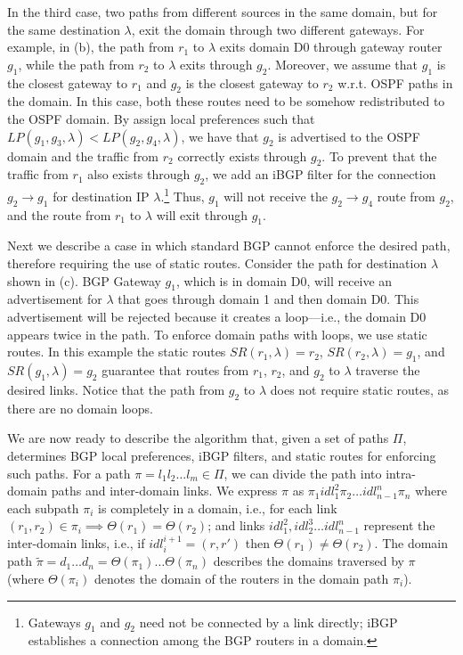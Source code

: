 In the third case, two paths from different sources in the same domain, but for the same destination $\lambda$, exit 
the domain through two different
gateways.
For example, in (b),
the path from $r_1$ to $\lambda$ exits domain D0 through 
gateway router $g_1$, while the path from $r_2$  to $\lambda$ exits 
through $g_2$. 
Moreover,  we assume that $g_1$ is the closest gateway to $r_1$ and 
$g_2$ is the closest gateway to $r_2$ w.r.t. OSPF paths in the domain.
In this case, both these routes need to be 
somehow redistributed to the OSPF domain. 
By assign local preferences such that
$LP(g_1,g_3,\lambda)<LP(g_2,g_4,\lambda)$,
we have that $g_2$ is advertised to the OSPF domain
and
the traffic from $r_2$ correctly exists through $g_2$. 
To prevent that the traffic from $r_1$ also exists through $g_2$,
we add an iBGP filter for the connection $g_2 \rightarrow g_1$ for
destination IP $\lambda$.\footnote{Gateways $g_1$ and $g_2$ need not be connected by a 
link directly; iBGP establishes a connection among the 
BGP routers in a domain.} Thus, $g_1$ will not receive the
$g_2 \rightarrow g_4$ route from $g_2$, 
and the route from  $r_1$ to $\lambda$ will exit through $g_1$.

 \label{sec:static}
Next we describe a case in which standard BGP cannot enforce
the desired path, therefore requiring the use of static routes.
Consider the path for destination $\lambda$ 
shown in (c). BGP Gateway $g_1$, which is in
domain D0, 
will receive an advertisement for $\lambda$ that goes through domain
1 and then domain D0.
This advertisement will be rejected because it creates a loop---i.e., the domain D0
appears twice in the path. 
To enforce domain paths with loops, we use static routes. In this example
the static routes
$SR(r_1,\lambda) = r_2$, $SR(r_2,\lambda) = g_1$, and $SR(g_1,\lambda) = g_2$ 
guarantee that routes from $r_1$, $r_2$, and $g_2$ to $\lambda$ traverse the desired links.
Notice that the path from $g_2$ to $\lambda$ does not 
require static routes, as there are no domain loops.

We are now ready to describe the algorithm that,
given a set of paths $\Pi$, determines
BGP local preferences, iBGP filters, and static routes for enforcing such paths.
For a path $\pi = l_1 l_2 \ldots l_m \in \Pi$, we
can divide the path into intra-domain paths and inter-domain
links. We express $\pi$ as 
$\pi_1 idl_1^2 \pi_2 \ldots idl_{n-1}^n \pi_n$ where
each subpath $\pi_i$ is completely in a
domain, i.e., for each 
link $(r_1,r_2) \in \pi_i \implies \Theta(r_1) = \Theta(r_2)$;
and links $idl_1^2, idl_2^3 \ldots idl_{n-1}^n$ 
represent the inter-domain links, i.e., 
if $idl_i^{i+1}=(r,r')$ then $\Theta(r_1) \neq \Theta(r_2)$. 
The domain path
$\tilde{\pi} = d_1 \ldots d_n=\Theta(\pi_1)\ldots \Theta(\pi_n)$ describes the 
domains traversed by $\pi$ (where
$\Theta(\pi_i)$ denotes the domain of the routers in the 
domain path $\pi_i$). 


